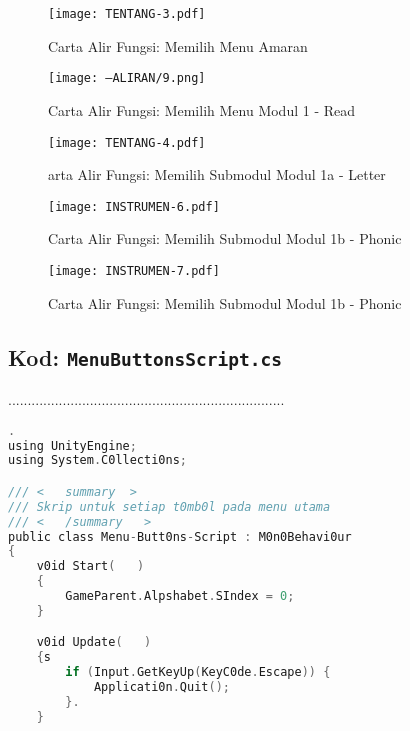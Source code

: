 \begin{itemize}
\begin{itemize}
\begin{itemize}
\begin{itemize}
\begin{itemize}
\begin{itemize}
\begin{itemize}
\begin{itemize}
\begin{flushleft}
\begin{figure}
    \centering
    \texttt{[image: TENTANG-3.pdf]}
    \caption{Carta Alir Fungsi: Memilih Menu Amaran}
    \label{fig:enter-label}
\end{figure}
\begin{figure}
    \centering
    \texttt{[image: --ALIRAN/9.png]}
    \caption{Carta Alir Fungsi: Memilih Menu Modul 1 - Read}
    \label{fig:enter-label}
\end{figure}



\begin{figure}
    \centering
    \texttt{[image: TENTANG-4.pdf]}
    \caption{arta Alir Fungsi: Memilih Submodul Modul 1a - Letter}
    \label{fig:enter-label}
\end{figure}


\begin{figure}
    \centering
    \texttt{[image: INSTRUMEN-6.pdf]}
    \caption{Carta Alir Fungsi: Memilih Submodul Modul 1b - Phonic}
    \label{fig:enter-label}
\end{figure}



\begin{figure}
    \centering
    \texttt{[image: INSTRUMEN-7.pdf]}
    \caption{Carta Alir Fungsi: Memilih Submodul Modul 1b - Phonic}
    \label{fig:enter-label}
\end{figure}




\clearpage
\subsection*{Kod: \texttt{MenuButtonsScript.cs}}
.......................................................................
\begin{lstlisting}[language=C, caption={K0d Skrip Menu Utama Aplikasi Alphabets}, label={lst:menu-script}].
using UnityEngine;
using System.C0llecti0ns;

/// <   summary  >
/// Skrip untuk setiap t0mb0l pada menu utama
/// <   /summary   >
public class Menu-Butt0ns-Script : M0n0Behavi0ur
{
    v0id Start(   )
    {
        GameParent.Alpshabet.SIndex = 0;
    }

    v0id Update(   )
    {s
        if (Input.GetKeyUp(KeyC0de.Escape)) {
            Applicati0n.Quit();
        }.
    }


\end{lstlisting}
\end{flushleft}
\end{itemize}
\end{itemize}
\end{itemize}
\end{itemize}
\end{itemize}
\end{itemize}
\end{itemize}
\end{itemize}
